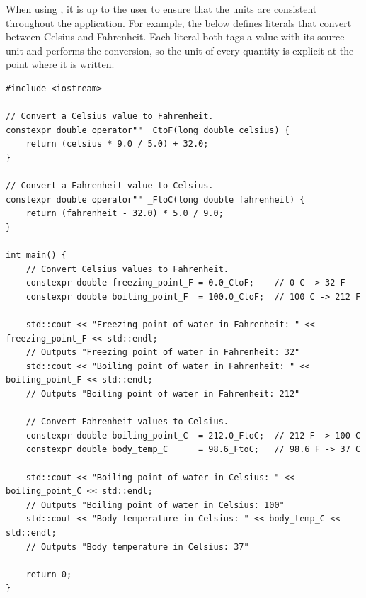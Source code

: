 When using  , it is up to the user to ensure that the units are consistent throughout the application. For example, the below defines literals that convert between Celsius and Fahrenheit. Each literal both tags a value with its source unit and performs the conversion, so the unit of every quantity is explicit at the point where it is written.
\begin{lstlisting}
#include <iostream>

// Convert a Celsius value to Fahrenheit.
constexpr double operator"" _CtoF(long double celsius) {
    return (celsius * 9.0 / 5.0) + 32.0;
}

// Convert a Fahrenheit value to Celsius.
constexpr double operator"" _FtoC(long double fahrenheit) {
    return (fahrenheit - 32.0) * 5.0 / 9.0;
}

int main() {
    // Convert Celsius values to Fahrenheit.
    constexpr double freezing_point_F = 0.0_CtoF;    // 0 C -> 32 F
    constexpr double boiling_point_F  = 100.0_CtoF;  // 100 C -> 212 F

    std::cout << "Freezing point of water in Fahrenheit: " << freezing_point_F << std::endl;
	// Outputs "Freezing point of water in Fahrenheit: 32"
    std::cout << "Boiling point of water in Fahrenheit: " << boiling_point_F << std::endl;
	// Outputs "Boiling point of water in Fahrenheit: 212"

    // Convert Fahrenheit values to Celsius.
    constexpr double boiling_point_C  = 212.0_FtoC;  // 212 F -> 100 C
    constexpr double body_temp_C      = 98.6_FtoC;   // 98.6 F -> 37 C

    std::cout << "Boiling point of water in Celsius: " << boiling_point_C << std::endl;
	// Outputs "Boiling point of water in Celsius: 100"
    std::cout << "Body temperature in Celsius: " << body_temp_C << std::endl;
	// Outputs "Body temperature in Celsius: 37"

    return 0;
}
\end{lstlisting}








\subsubsection{}

